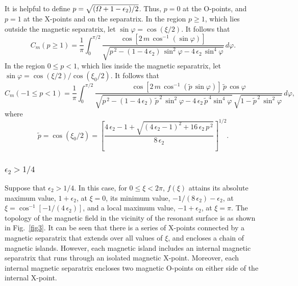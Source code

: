 \documentclass[12pt,prb,aps]{revtex4-1}
\begin{document}
It is helpful to define $p=\sqrt{({\mit\Omega}+1-\epsilon_2)/2}$.  Thus, $p=0$ at the O-points, and $p=1$ at the
X-points and on the separatrix. In the region $p\geq1$, which lies outside the magnetic separatrix, let $\sin\varphi = \cos(\xi/2)$. 
It follows that 
\begin{equation}
 C_m(p\geq 1)=\frac{1}{\pi} \int_{0}^{\pi/2}\frac{\cos[2\,m\,\cos^{-1}(\sin\varphi)]}
 {\sqrt{p^{\,2}-(1-4\,\epsilon_2)\,\sin^2\varphi-4\,\epsilon_2\,\sin^4\varphi}}\,d\varphi.
\end{equation}
In the region $0\leq p< 1$, which lies inside the magnetic separatrix, let 
$\sin\varphi = \cos(\xi/2)/\cos(\xi_0/2)$.
 It follows that 
\begin{equation}
 C_m(-1\leq p< 1)=\frac{1}{\pi} \int_{0}^{\pi/2}\frac{\cos[2\,m\,\cos^{-1}(\tilde{p}\,\sin\varphi)]\,\tilde{p}\,\cos\varphi}
 {\sqrt{p^{\,2}-(1-4\,\epsilon_2)\,\tilde{p}^{\,2}\,\sin^2\varphi-4\,\epsilon_2\,\tilde{p}^{\,4}\sin^4\varphi}\,\sqrt{1-\tilde{p}^{\,2}\,\sin^2\varphi}}\,d\varphi,
\end{equation}
where
\begin{equation}\label{tildep}
\tilde{p}= \cos(\xi_0/2) = \left[\frac{4\,\epsilon_2-1+\sqrt{(4\,\epsilon_2-1)^2+16\,\epsilon_2\,p^{\,2}}}{8\,\epsilon_2}\right]^{1/2}.
\end{equation}


\subsubsection{$\epsilon_2 > 1/4$}
Suppose that $\epsilon_2> 1/4$. In this case, for $0\leq \xi< 2\pi$, $f(\xi)$ attains its absolute maximum value, $1+\epsilon_2$, at $\xi=0$, its minimum value, $-1/(8\,\epsilon_2)-\epsilon_2$, at $\xi=\cos^{-1}[-1/(4\,\epsilon_2)]$,
and a local maximum value, $-1+\epsilon_2$, at $\xi=\pi$.    The topology of the magnetic field 
in the vicinity of the resonant surface is as shown in Fig.~\ref{fig3}. It can be seen that there is  a series of X-points connected by a
magnetic separatrix that extends over all values of $\xi$, and encloses a chain of magnetic islands. However,
each magnetic island includes an internal magnetic separatrix that runs through an isolated magnetic
X-point. Moreover, each internal magnetic separatrix encloses two magnetic O-points on either side of the
internal X-point. 
\end{document}
